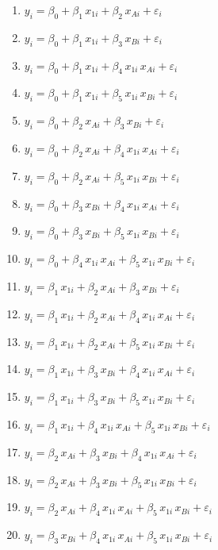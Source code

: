 \documentclass[
  letterpaper,
  DIV=11,
  numbers=noendperiod]{scrartcl}
\begin{document}
\begin{enumerate}
  

  \item $y_i = \beta_0 + \beta_1 \, x_{1i} + \beta_2 \, x_{Ai} + \varepsilon_i$
  \item $y_i = \beta_0 + \beta_1 \, x_{1i} + \beta_3 \, x_{Bi} + \varepsilon_i$
  \item $y_i = \beta_0 + \beta_1 \, x_{1i} + \beta_4 \, x_{1i} \, x_{Ai} + \varepsilon_i$
  \item $y_i = \beta_0 + \beta_1 \, x_{1i} + \beta_5 \, x_{1i} \, x_{Bi} + \varepsilon_i$
  \item $y_i = \beta_0 + \beta_2 \, x_{Ai} + \beta_3 \, x_{Bi} + \varepsilon_i$
  \item $y_i = \beta_0 + \beta_2 \, x_{Ai} + \beta_4 \, x_{1i} \, x_{Ai} +  \varepsilon_i$
  \item $y_i = \beta_0 + \beta_2 \, x_{Ai} + \beta_5 \, x_{1i} \, x_{Bi} + \varepsilon_i$
  \item $y_i = \beta_0 + \beta_3 \, x_{Bi} + \beta_4 \, x_{1i} \, x_{Ai} +  \varepsilon_i$
  \item $y_i = \beta_0 + \beta_3 \, x_{Bi} + \beta_5 \, x_{1i} \, x_{Bi} + \varepsilon_i$
  \item $y_i = \beta_0 + \beta_4 \, x_{1i} \, x_{Ai} + \beta_5 \, x_{1i} \, x_{Bi} + \varepsilon_i$
  \item $y_i = \beta_1 \, x_{1i} + \beta_2 \, x_{Ai} + \beta_3 \, x_{Bi} + \varepsilon_i$
  \item $y_i = \beta_1 \, x_{1i} + \beta_2 \, x_{Ai} + \beta_4 \, x_{1i} \, x_{Ai} + \varepsilon_i$
  \item $y_i = \beta_1 \, x_{1i} + \beta_2 \, x_{Ai} + \beta_5 \, x_{1i} \, x_{Bi} + \varepsilon_i$
  \item $y_i = \beta_1 \, x_{1i} + \beta_3 \, x_{Bi} + \beta_4 \, x_{1i} \, x_{Ai} + \varepsilon_i$
  \item $y_i = \beta_1 \, x_{1i} + \beta_3 \, x_{Bi} + \beta_5 \, x_{1i} \, x_{Bi} + \varepsilon_i$
  \item $y_i = \beta_1 \, x_{1i} + \beta_4 \, x_{1i} \, x_{Ai} + \beta_5 \, x_{1i} \, x_{Bi} + \varepsilon_i$
  \item $y_i = \beta_2 \, x_{Ai} + \beta_3 \, x_{Bi} + \beta_4 \, x_{1i} \, x_{Ai} + \varepsilon_i$
  \item $y_i = \beta_2 \, x_{Ai} + \beta_3 \, x_{Bi} + \beta_5 \, x_{1i} \, x_{Bi} + \varepsilon_i$
  \item $y_i = \beta_2 \, x_{Ai} + \beta_4 \, x_{1i} \, x_{Ai} + \beta_5 \, x_{1i} \, x_{Bi} + \varepsilon_i$
  \item $y_i = \beta_3 \, x_{Bi} + \beta_4 \, x_{1i} \, x_{Ai} + \beta_5 \, x_{1i} \, x_{Bi} + \varepsilon_i$
  


\end{enumerate}
\end{document}
